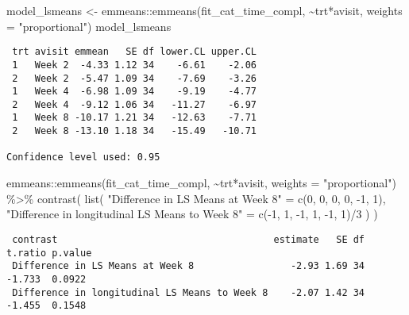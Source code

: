 \documentclass[
  letterpaper,
  DIV=11,
  numbers=noendperiod]{scrreprt}
\newenvironment{Shaded}{\begin{snugshade}}{\end{snugshade}}
\newcommand{\AttributeTok}[1]{\textcolor[rgb]{0.40,0.45,0.13}{#1}}
\newcommand{\DecValTok}[1]{\textcolor[rgb]{0.68,0.00,0.00}{#1}}
\newcommand{\FunctionTok}[1]{\textcolor[rgb]{0.28,0.35,0.67}{#1}}
\newcommand{\NormalTok}[1]{\textcolor[rgb]{0.00,0.23,0.31}{#1}}
\newcommand{\OtherTok}[1]{\textcolor[rgb]{0.00,0.23,0.31}{#1}}
\newcommand{\SpecialCharTok}[1]{\textcolor[rgb]{0.37,0.37,0.37}{#1}}
\newcommand{\StringTok}[1]{\textcolor[rgb]{0.13,0.47,0.30}{#1}}
\begin{document}
\begin{Shaded}
\begin{Highlighting}[]
\NormalTok{model\_lsmeans }\OtherTok{\textless{}{-}}\NormalTok{ emmeans}\SpecialCharTok{::}\FunctionTok{emmeans}\NormalTok{(fit\_cat\_time\_compl, }\SpecialCharTok{\textasciitilde{}}\NormalTok{trt}\SpecialCharTok{*}\NormalTok{avisit, }\AttributeTok{weights =} \StringTok{"proportional"}\NormalTok{)}
\NormalTok{model\_lsmeans}
\end{Highlighting}
\end{Shaded}

\begin{verbatim}
 trt avisit emmean   SE df lower.CL upper.CL
 1   Week 2  -4.33 1.12 34    -6.61    -2.06
 2   Week 2  -5.47 1.09 34    -7.69    -3.26
 1   Week 4  -6.98 1.09 34    -9.19    -4.77
 2   Week 4  -9.12 1.06 34   -11.27    -6.97
 1   Week 8 -10.17 1.21 34   -12.63    -7.71
 2   Week 8 -13.10 1.18 34   -15.49   -10.71

Confidence level used: 0.95 
\end{verbatim}

\begin{Shaded}
\begin{Highlighting}[]
\NormalTok{emmeans}\SpecialCharTok{::}\FunctionTok{emmeans}\NormalTok{(fit\_cat\_time\_compl, }\SpecialCharTok{\textasciitilde{}}\NormalTok{trt}\SpecialCharTok{*}\NormalTok{avisit, }\AttributeTok{weights =} \StringTok{"proportional"}\NormalTok{) }\SpecialCharTok{\%\textgreater{}\%} 
  \FunctionTok{contrast}\NormalTok{(}
    \FunctionTok{list}\NormalTok{(}
      \StringTok{"Difference in LS Means at Week 8"} \OtherTok{=} \FunctionTok{c}\NormalTok{(}\DecValTok{0}\NormalTok{, }\DecValTok{0}\NormalTok{, }\DecValTok{0}\NormalTok{, }\DecValTok{0}\NormalTok{, }\SpecialCharTok{{-}}\DecValTok{1}\NormalTok{, }\DecValTok{1}\NormalTok{),}
      \StringTok{"Difference in longitudinal LS Means to Week 8"} \OtherTok{=} \FunctionTok{c}\NormalTok{(}\SpecialCharTok{{-}}\DecValTok{1}\NormalTok{, }\DecValTok{1}\NormalTok{, }\SpecialCharTok{{-}}\DecValTok{1}\NormalTok{, }\DecValTok{1}\NormalTok{, }\SpecialCharTok{{-}}\DecValTok{1}\NormalTok{, }\DecValTok{1}\NormalTok{)}\SpecialCharTok{/}\DecValTok{3}
\NormalTok{    )}
\NormalTok{  )}
\end{Highlighting}
\end{Shaded}

\begin{verbatim}
 contrast                                      estimate   SE df t.ratio p.value
 Difference in LS Means at Week 8                 -2.93 1.69 34  -1.733  0.0922
 Difference in longitudinal LS Means to Week 8    -2.07 1.42 34  -1.455  0.1548
\end{verbatim}
\end{document}
